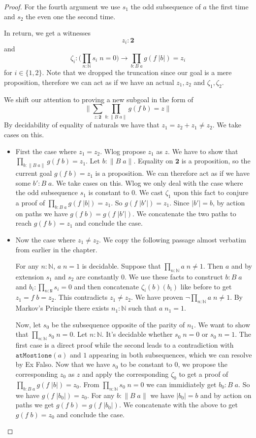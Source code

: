 \documentclass[12pt]{report}
\theoremstyle{definition}
\begin{document}
\begin{proof}
For the fourth argument we use $s_1$ the odd subsequence of $a$ the first time and $s_2$ the even one the second time. 

In return, we get a witnesses 
$$z_i : \mathbf{2}$$
and
$$\zeta_i : \Big(\prod_{n : \mathbb{N}}s_i\; n = 0 \Big)\rightarrow \prod_{b : B\; a} g(f\; |b|) = z_i$$
for $i \in \{1,2\}$.  
Note that we dropped the truncation since our goal is a mere proposition, therefore we can act as if we have an actual $z_1,z_2$ and $\zeta_1, \zeta_2$. 

We shift our attention to proving a new subgoal in the form of 
$$\Big\lVert \sum_{z : \mathbf{2}} \prod_{b : \lVert B\; a\rVert} g(f\; b) = z \Big\rVert$$
By decidability of equality of naturals we have that $z_1 = z_2 + z_1 \neq z_2$. 
We take cases on this. 
\begin{itemize}
\item First the case where $z_1 = z_2$. 
Wlog propose $z_1$ as $z$. 
We have to show that $\prod_{b : \lVert B\;a\rVert}g(f\;b)=z_1$. 
Let $b : \lVert B\;a \rVert$. 
Equality on $\mathbf{2}$ is a proposition, so the current goal $g(f\;b)=z_1$ is a proposition. 
We can therefore act as if we have some $b' : B\;a$. 
We take cases on this. 
Wlog we only deal with the case where the odd subsequence $s_1$ is constant to $0$. 
We cast $\zeta_1$ upon this fact to conjure a proof of $\prod_{b : B\; a} g(f\; |b|) = z_1$. 
So $g(f\;|b'|) = z_1$. 
Since $|b'| = b$, by action on paths we have $g(f\;b) = g(f\;|b'|)$. 
We concatenate the two paths to reach $g(f\;b) = z_1$ and conclude the case. 

\item Now the case where $z_1 \neq z_2$. 
We copy the following passage almost verbatim from earlier in the chapter. 

For any $n : \mathbb{N}$, $a\; n = 1$ is decidable. 
Suppose that $\prod_{n : 
\mathbb{N}} a\; n \neq 1$. 
Then $a$ and by extension $s_1$ and $s_2$ are constantly $0$. 
We use these facts to construct $b : B\;a$ and $b_i : \prod_{n : \mathtt{N}}s_i = 0$ and then concatenate $\zeta_i(b)(b_i)$ like before to get $z_1 = f\; b = z_2$. 
This contradicts $z_1 \neq z_2$. 
We have proven $\neg \prod_{n : 
\mathbb{N}} a\; n \neq 1$. 
By Markov's Principle there exists $n_1 : \mathbb{N}$ such that $a\; n_1 = 1$. 

Now, let $s_0$ be the subsequence opposite of the parity of $n_1$. 
We want to show that $\prod_{n : \mathbb{N}}s_0\; n = 0$. 
Let $n : \mathbb{N}$. 
It's decidable whether $s_0\;n = 0$ or $s_0\;n=1$. 
The first case is a direct proof while the second leads to a contradiction with $\mathtt{atMost1one}(a)$ and $1$ appearing in both subsequences, which we can resolve by Ex Falso. 
Now that we have $s_0$ to be constant to $0$, we propose the corresponding $z_0$ as $z$ and apply the corresponding $\zeta_0$ to get a proof of $\prod_{b : B\;a}g(f\;|b|) = z_0$. 
From $\prod_{n:\mathbb{N}}s_0\; n = 0$ we can immidiately get $b_0  : B\;a$. 
So we have $g(f\;|b_0|) = z_0$. 
For any $b : \lVert B\;a \rVert$ we have $|b_0| = b$ and by action on paths we get $g(f\;b) = g(f\;|b_0|)$. 
We concatenate with the above to get $g(f\;b) = z_0$ and conclude the case.


\end{itemize}
\end{proof}
\end{document}
